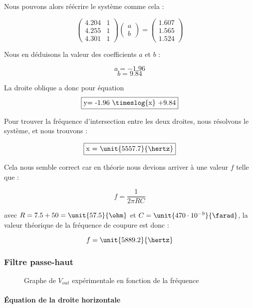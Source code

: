 Nous pouvons alors réécrire le système comme cela :

$$
\begin{pmatrix}
 4.204 & 1\\
 4.255 & 1 \\
 4.301 & 1
\end{pmatrix}
\begin{pmatrix}
a\\
b
\end{pmatrix}
=
\begin{pmatrix}
1.607\\
1.565\\
1.524
\end{pmatrix}
$$


Nous en déduisons la valeur des coefficients $a$ et $b$ :

$$a = -1.96$$
$$b= 9.84$$

La droite oblique a donc pour équation
$$\fbox{y= -1.96 \timeslog{x} +9.84}$$

Pour trouver la fréquence d'intersection entre les deux droites, nous résolvons le système, et nous
trouvons :

$$\fbox{x = \unit{5557.7}{\hertz}}$$

Cela nous semble correct car en théorie nous devions arriver à une valeur $f$ telle que :

$$f=\frac{1}{2\pi RC}$$

avec $R= 7.5 + 50 = \unit{57.5}{\ohm}$ et $C= \unit{470 \cdot 10^{-9}}{\farad}$, la valeur théorique de 
la fréquence de coupure est donc :

$$f= \unit{5889.2}{\hertz}$$

\subsubsection{Filtre passe-haut}

\begin{figure}[ht!]
\centering
{}
\caption{Graphe de $V_{out}$ expérimentale en fonction de la fréquence}
\label{lwp_ratio}
\end{figure}


\paragraph{Équation de la droite horizontale}

